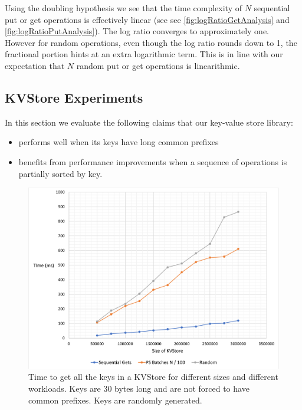 Using the doubling hypothesis we see that the time complexity of $N$ sequential put or get operations is effectively linear (see see \ref{fig:logRatioGetAnalysis} and \ref{fig:logRatioPutAnalysis}). The log ratio converges to approximately one. However for random operations, even though the log ratio rounds down to 1, the fractional portion hints at an extra logarithmic term. This is in line with our expectation that $N$ random put or get operations is linearithmic.


\subsection{KVStore Experiments}

In this section we evaluate the following claims that our key-value store library: 
\begin{itemize}
    \item performs well when its keys have long common prefixes
    \item benefits from performance improvements when a sequence of operations is partially sorted by key.
\end{itemize}


\begin{figure}[h]
    \centering
    \includegraphics[scale=0.50]{figures/KVStoregetsgraph.png}
    \caption{Time to get all the keys in a KVStore for different sizes and different workloads. Keys are 30 bytes long and are not forced to have common prefixes. Keys are randomly generated.}
    \label{fig:KVStoreGetsGraph}
\end{figure}

